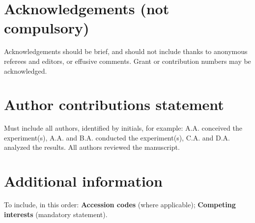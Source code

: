 \documentclass[fleqn,10pt]{wlscirep}
\begin{document}
\section*{Acknowledgements (not compulsory)}

Acknowledgements should be brief, and should not include thanks to anonymous referees and editors, or effusive comments. Grant or contribution numbers may be acknowledged.

\section*{Author contributions statement}

Must include all authors, identified by initials, for example:
A.A. conceived the experiment(s),  A.A. and B.A. conducted the experiment(s), C.A. and D.A. analyzed the results.  All authors reviewed the manuscript. 

\section*{Additional information}

To include, in this order: \textbf{Accession codes} (where applicable); \textbf{Competing interests} (mandatory statement). 
\end{document}
